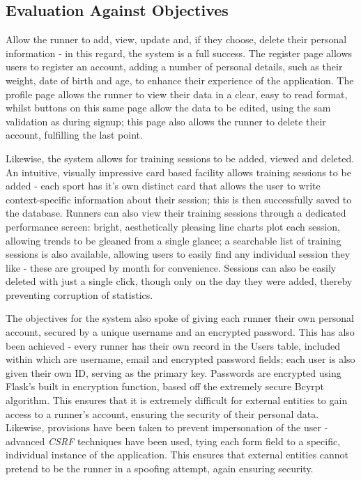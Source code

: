 \documentclass{article}[12pt,a4paper]
\begin{document}
{\subsection{Evaluation Against Objectives}
Allow the runner to add, view, update and, if they choose, delete their personal information - in this regard, the system is a full success. The register page allows users to register an account, adding a number of personal details, such as their weight, date of birth and age, to enhance their experience of the application. The profile page allows the runner to view their data in a clear, easy to read format, whilst buttons on this same page allow the data to be edited, using the sam validation as during signup; this page also allows the runner to delete their account, fulfilling the last point.

Likewise, the system allows for training sessions to be added, viewed and deleted. An intuitive, visually impressive card based facility allows training sessions to be added - each sport has it's own distinct card that allows the user to write context-specific information about their session; this is then successfully saved to the database. Runners can also view their training sessions through a dedicated performance screen: bright, aesthetically pleasing line charts plot each session, allowing trends to be gleaned from a single glance; a searchable list of training sessions is also available, allowing users to easily find any individual session they like - these are grouped by month for convenience. Sessions can also be easily deleted with just a single click, though only on the day they were added, thereby preventing corruption of statistics.

The objectives for the system also spoke of giving each runner their own personal account, secured by a unique username and an encrypted password. This has also been achieved - every runner has their own record in the Users table, included within which are username, email and encrypted password fields; each user is also given their own ID, serving as the primary key. Passwords are encrypted using Flask's built in encryption function, based off the extremely secure Bcyrpt algorithm. This ensures that it is extremely difficult for external entities to gain access to a runner's account, ensuring the security of their personal data. Likewise, provisions have been taken to prevent impersonation of the user - advanced \textit{CSRF} techniques have been used, tying each form field to a specific, individual instance of the application. This ensures that external entities cannot pretend to be the runner in a spoofing attempt, again ensuring security.

}
\end{document}
